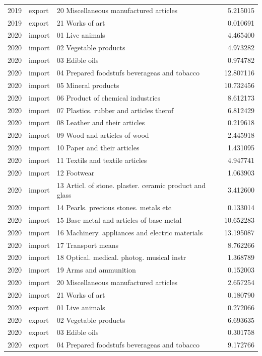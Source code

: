 \begin{tabular}{rllr}
2019 & export & 20 Miscellaneous manufactured articles & 5.215015 \\
2019 & export & 21 Works of art & 0.010691 \\
2020 & import & 01 Live animals & 4.465400 \\
2020 & import & 02 Vegetable products & 4.973282 \\
2020 & import & 03 Edible oils & 0.974782 \\
2020 & import & 04 Prepared foodstufs beverageas and tobacco & 12.807116 \\
2020 & import & 05 Mineral products & 10.732456 \\
2020 & import & 06 Product of chemical industries & 8.612173 \\
2020 & import & 07 Plastics. rubber and articles therof & 6.812429 \\
2020 & import & 08 Leather and their articles & 0.219618 \\
2020 & import & 09 Wood and articles of wood & 2.445918 \\
2020 & import & 10 Paper and their articles & 1.431095 \\
2020 & import & 11 Textils and textile articles & 4.947741 \\
2020 & import & 12 Footwear & 1.063903 \\
2020 & import & 13 Articl. of stone. plaster. ceramic product and glass & 3.412600 \\
2020 & import & 14 Pearls. precious stones. metals etc & 0.133014 \\
2020 & import & 15 Base metal and articles of base metal & 10.652283 \\
2020 & import & 16 Machinery. appliances and electric materials & 13.195087 \\
2020 & import & 17 Transport means & 8.762266 \\
2020 & import & 18 Optical. medical. photog. musical instr & 1.368789 \\
2020 & import & 19 Arms and ammunition & 0.152003 \\
2020 & import & 20 Miscellaneous manufactured articles & 2.657254 \\
2020 & import & 21 Works of art & 0.180790 \\
2020 & export & 01 Live animals & 0.272066 \\
2020 & export & 02 Vegetable products & 6.693635 \\
2020 & export & 03 Edible oils & 0.301758 \\
2020 & export & 04 Prepared foodstufs beverageas and tobacco & 9.172766 \\

\end{tabular}
